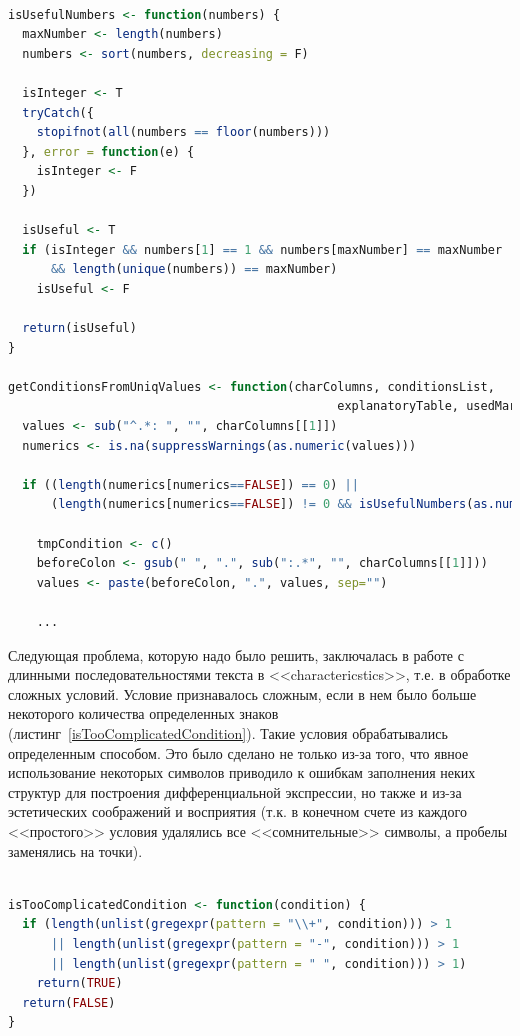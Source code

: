 \documentclass[times,specification,annotation]{itmo-student-thesis}
\begin{document}
\begin{lstlisting}[float=!h, caption={Проверка значимости столбца <<charactericstics>>.}, captionpos=b, label={checkImportanceCharacterictics}, basicstyle=\footnotesize, language=R]

isUsefulNumbers <- function(numbers) {
  maxNumber <- length(numbers)
  numbers <- sort(numbers, decreasing = F)
  
  isInteger <- T
  tryCatch({
    stopifnot(all(numbers == floor(numbers)))
  }, error = function(e) {
    isInteger <- F
  })
  
  isUseful <- T
  if (isInteger && numbers[1] == 1 && numbers[maxNumber] == maxNumber 
      && length(unique(numbers)) == maxNumber) 
    isUseful <- F
  
  return(isUseful)
}

getConditionsFromUniqValues <- function(charColumns, conditionsList, 
                                              explanatoryTable, usedMarkers) {
  values <- sub("^.*: ", "", charColumns[[1]])
  numerics <- is.na(suppressWarnings(as.numeric(values)))
  
  if ((length(numerics[numerics==FALSE]) == 0) || 
      (length(numerics[numerics==FALSE]) != 0 && isUsefulNumbers(as.numeric(values)))) {
    
    tmpCondition <- c()
    beforeColon <- gsub(" ", ".", sub(":.*", "", charColumns[[1]]))
    values <- paste(beforeColon, ".", values, sep="")
    
    ...

\end{lstlisting} 

Следующая проблема, которую надо было решить, заключалась в работе с длинными последовательностями текста в <<charactericstics>>, т.е. в обработке сложных условий. Условие признавалось сложным, если в нем было больше некоторого количества определенных знаков (листинг~\ref{isTooComplicatedCondition}). Такие условия обрабатывались определенным способом. Это было сделано не только из-за того, что явное использование некоторых символов приводило к ошибкам заполнения неких структур для построения дифференциальной экспрессии, но также и из-за эстетических соображений и восприятия (т.к. в конечном счете из каждого <<простого>> условия удалялись все <<сомнительные>> символы, а пробелы заменялись на точки).     

\begin{lstlisting}[float=!h, caption={Проверка сложности условия.}, captionpos=b, label={isTooComplicatedCondition}, basicstyle=\footnotesize, language=R]

isTooComplicatedCondition <- function(condition) {
  if (length(unlist(gregexpr(pattern = "\\+", condition))) > 1
      || length(unlist(gregexpr(pattern = "-", condition))) > 1
      || length(unlist(gregexpr(pattern = " ", condition))) > 1)
    return(TRUE)
  return(FALSE)
}

\end{lstlisting} 
\end{document}
